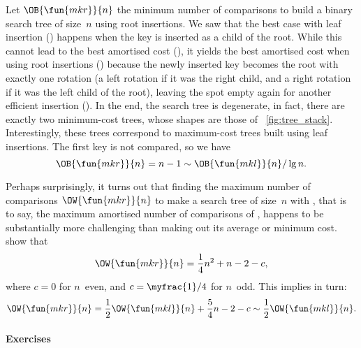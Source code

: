 Let \(\OB{\fun{mkr}}{n}\) the minimum
number of comparisons to build a binary search tree of size~\(n\)
using root insertions. We saw that the best case with leaf insertion
() happens when the key is inserted as a child of the
root. While this cannot lead to the best amortised cost (),
it yields the best amortised cost when using root insertions
() because the newly inserted key becomes the root with
exactly one rotation (a left rotation if it was the right child, and a
right rotation if it was the left child of the root), leaving the spot
empty again for another efficient insertion (). In the
end, the search tree is degenerate, in fact, there are exactly two
minimum\hyp{}cost trees, whose shapes are those of
\fig~\vref{fig:tree_stack}. Interestingly, these trees correspond to
maximum\hyp{}cost trees built using leaf insertions. The first key is
not compared, so we have
\begin{equation*}
  \OB{\fun{mkr}}{n} = n - 1 \sim \OB{\fun{mkl}}{n}/\lg n.
\end{equation*}

Perhaps surprisingly, it turns out that finding the maximum number of
comparisons \(\OW{\fun{mkr}}{n}\)
to make a search tree of size~\(n\) with , that is to say,
the maximum amortised number of comparisons of , happens
to be substantially more challenging than making out its average or
minimum cost. \cite{GeldenhuysVanderMerwe_2009} show that
\begin{equation*}
\OW{\fun{mkr}}{n} = \frac{1}{4}n^2 + n - 2 - c,
\end{equation*}
where \(c = 0\) for \(n\)~even, and \(c=\myfrac{1}/{4}\) for
\(n\)~odd. This implies in turn:
\begin{equation*}
\OW{\fun{mkr}}{n} = \frac{1}{2}\OW{\fun{mkl}}{n} + \frac{5}{4}n - 2 -
c \sim \frac{1}{2}\OW{\fun{mkl}}{n}.
\end{equation*}

\paragraph{Exercises}

